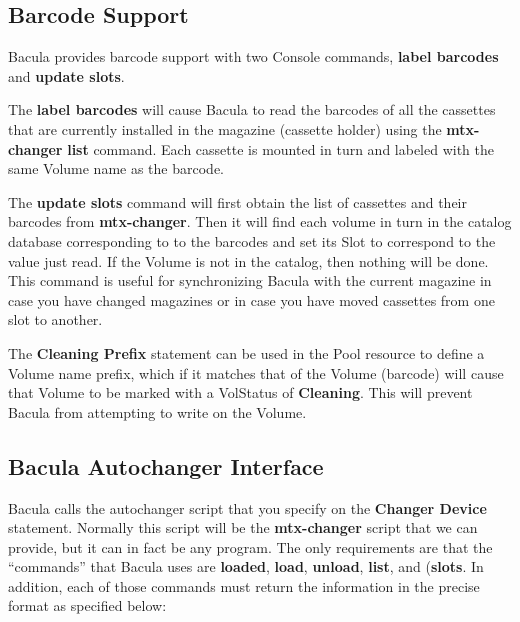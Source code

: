 \label{Barcodes}

\subsection*{Barcode Support}

Bacula provides barcode support with two Console commands, {\bf label
barcodes} and {\bf update slots}.

The {\bf label barcodes} will cause Bacula to read the barcodes of all the
cassettes that are currently installed in the magazine (cassette holder) using
the {\bf mtx-changer} {\bf list} command. Each cassette is mounted in turn and
labeled with the same Volume name as the barcode. 

The {\bf update slots} command will first obtain the list of cassettes and
their barcodes from {\bf mtx-changer}. Then it will find each volume in turn
in the catalog database corresponding to to the barcodes and set its Slot to
correspond to the value just read. If the Volume is not in the catalog, then
nothing will be done. This command is useful for synchronizing Bacula with the
current magazine in case you have changed magazines or in case you have moved
cassettes from one slot to another.

The {\bf Cleaning Prefix} statement can be used in the Pool resource to define
a Volume name prefix, which if it matches that of the Volume (barcode) will
cause that Volume to be marked with a VolStatus of {\bf Cleaning}. This will
prevent Bacula from attempting to write on the Volume.

\label{interface}

\subsection*{Bacula Autochanger Interface}

Bacula calls the autochanger script that you specify on the {\bf Changer
Device} statement. Normally this script will be the {\bf mtx-changer} script
that we can provide, but it can in fact be any program. The only requirements
are that the ``commands'' that Bacula uses are {\bf loaded}, {\bf load}, {\bf
unload}, {\bf list}, and ({\bf slots}. In addition,
each of those commands must return the information in the precise format as
specified below: 

